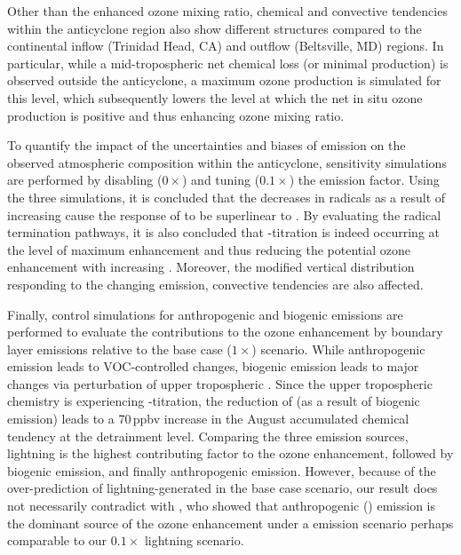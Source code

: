 Other than the enhanced ozone mixing ratio, chemical and convective tendencies within the anticyclone region also
show different structures compared to the continental inflow (Trinidad Head, CA) and outflow (Beltsville, MD)
regions. In particular, while a mid-tropospheric net chemical loss (or minimal production) is observed outside
the anticyclone, a maximum ozone production is simulated for this level, which subsequently lowers the level
at which the net in situ ozone production is positive and thus enhancing ozone mixing ratio.

To quantify the impact of the uncertainties and biases of {\lnox} emission on the observed atmospheric composition
within the anticyclone, sensitivity simulations are performed by disabling ($0\times$) and tuning
($0.1\times$) the emission factor. Using the three simulations, it is concluded that the decreases in  radicals as a result of
increasing  cause the response of  to be superlinear to {\lnox}. By evaluating the
radical termination pathways, it is also concluded that -titration is indeed occurring at the level of
maximum  enhancement and thus reducing the potential ozone enhancement with increasing
{\lnox}. Moreover, the modified vertical distribution responding to the changing {\lnox} emission,
convective tendencies are also affected.

Finally, control simulations for anthropogenic and biogenic emissions are performed to evaluate the contributions
to the ozone enhancement by boundary layer emissions relative to the base case ($1\times$) scenario. While anthropogenic emission leads to
VOC-controlled changes, biogenic emission leads to major changes via perturbation of upper tropospheric . Since the
upper tropospheric chemistry is experiencing -titration, the reduction of  (as a result of
biogenic emission) leads to a 70\,\unit{ppbv} increase in the August accumulated chemical tendency at the detrainment level.
Comparing the three emission sources, lightning is the highest contributing factor to the ozone enhancement, followed by
biogenic emission, and finally anthropogenic emission. However, because of the over-prediction of lightning-generated
 in the base case scenario, our result does not necessarily contradict with \citet{Li:2005ss}, who
showed that anthropogenic () emission is the dominant source of the ozone enhancement under a {\lnox}
emission scenario perhaps comparable to our $0.1\times$ lightning scenario.